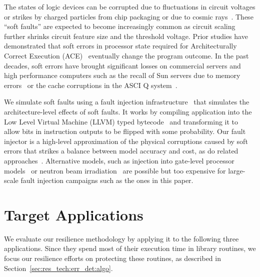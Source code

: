\documentclass[10pt, conference, compsocconf]{IEEEtran}
\begin{document}
The states of logic devices can be corrupted due to fluctuations in circuit voltages or strikes by charged particles from chip packaging or due to cosmic rays~\cite{Ziegler:1996:TCR:226354.226356,baumann:2005}.
These ``soft faults'' are expected to become increasingly common as circuit scaling further shrinks circuit feature size and the threshold voltage.
Prior studies have demonstrated that soft errors in processor state required for Architecturally Correct Execution (ACE)~\cite{avf:2003,mpi_ser:reed:2004} eventually change the program outcome.
In the past decades, soft errors have brought significant losses on commercial servers and high performance computers such as the recall of Sun servers due to memory errors~\cite{baumann:2005} or the cache corruptions in the ASCI Q system~\cite{asciQSER:2005}.


We simulate soft faults using a fault injection infrastructure~\cite{relax:2010} that simulates the architecture-level effects of soft faults.
It works by compiling application into the Low Level Virtual Machine (LLVM) typed bytecode~\cite{LLVM} and transforming it to allow bits in instruction outputs to be flipped with some probability.
Our fault injector is a high-level approximation of the physical corruptions caused by soft errors that strikes a balance between model accuracy and cost, as do related approaches~\cite{fault_injection:iyer:1997, avf:2003}.
Alternative models, such as injection into gate-level processor models~\cite{sesee:2004} or neutron beam irradiation~\cite{freq_dep:irom:2004} are possible but too expensive for large-scale fault injection campaigns such as the ones in this paper.

\section{Target Applications}
\label{sec:apps}

We evaluate our resilience methodology by applying it to the following three applications.
Since they spend most of their execution time in library routines, we focus our resilience efforts on protecting these routines, as described in Section~\ref{sec:res_tech:err_det:algo}.
\end{document}
